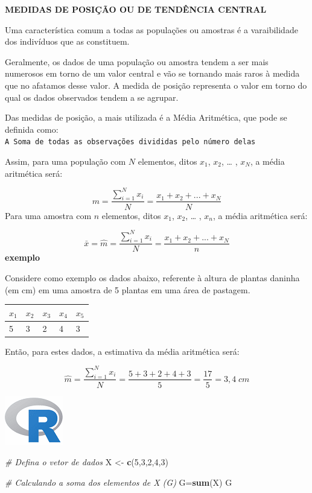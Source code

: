 \documentclass[
]{book}
\newenvironment{Shaded}{\begin{snugshade}}{\end{snugshade}}
\newcommand{\CommentTok}[1]{\textcolor[rgb]{0.56,0.35,0.01}{\textit{#1}}}
\newcommand{\DecValTok}[1]{\textcolor[rgb]{0.00,0.00,0.81}{#1}}
\newcommand{\KeywordTok}[1]{\textcolor[rgb]{0.13,0.29,0.53}{\textbf{#1}}}
\newcommand{\NormalTok}[1]{#1}
\newcommand{\StringTok}[1]{\textcolor[rgb]{0.31,0.60,0.02}{#1}}
\begin{document}
\textbf{MEDIDAS DE POSIÇÃO OU DE TENDÊNCIA CENTRAL}

Uma característica comum a todas as populações ou amostras é a varaibilidade dos indivíduos que as constituem.

Geralmente, os dados de uma população ou amostra tendem a ser mais numerosos em torno de um valor central e vão se tornando mais raros à medida que no afatamos desse valor. A medida de posição representa o valor em torno do qual os dados observados tendem a se agrupar.

Das medidas de posição, a mais utilizada é a Média Aritmética, que pode se definida como: \texttt{A\ Soma\ de\ todas\ as\ observações\ divididas\ pelo\ número\ delas}

Assim, para uma população com \(N\) elementos, ditos \(x_1\), \(x_2\), \ldots{} , \(x_N\), a média aritmética será:

\[
m = \frac{\sum_{i=1}^{N}x_i}{N} = \frac{x_1+x_2+...+x_N}{N}
\]
Para uma amostra com \(n\) elementos, ditos \(x_1\), \(x_2\), \ldots{} , \(x_n\), a média aritmética será:

\[
\bar{x}=\hat{m} = \frac{\sum_{i=1}^{N}x_i}{N} = \frac{x_1+x_2+...+x_N}{n}
\]
\textbf{exemplo}

Considere como exemplo os dados abaixo, referente à altura de plantas daninha (em cm) em uma amostra de 5 plantas em uma área de pastagem.

\begin{longtable}[]{@{}lllll@{}}
\toprule
\(x_1\) & \(x_2\) & \(x_3\) & \(x_4\) & \(x_5\)\tabularnewline
\midrule
\endhead
5 & 3 & 2 & 4 & 3\tabularnewline
\bottomrule
\end{longtable}

Então, para estes dados, a estimativa da média aritmética será:

\[
\hat{m} = \frac{\sum_{i=1}^{N}x_i}{N} = \frac{5+3+2+4+3}{5} = \frac{17}{5} = 3,4\;cm
\]

\includegraphics{R.png}

\begin{Shaded}
\begin{Highlighting}[]
\CommentTok{# Defina o vetor de dados}
\NormalTok{X <-}\StringTok{ }\KeywordTok{c}\NormalTok{(}\DecValTok{5}\NormalTok{,}\DecValTok{3}\NormalTok{,}\DecValTok{2}\NormalTok{,}\DecValTok{4}\NormalTok{,}\DecValTok{3}\NormalTok{)}

\CommentTok{# Calculando a soma dos elementos de X (G)}
\NormalTok{G=}\KeywordTok{sum}\NormalTok{(X)}
\NormalTok{G}
\end{Highlighting}
\end{Shaded}
\end{document}
